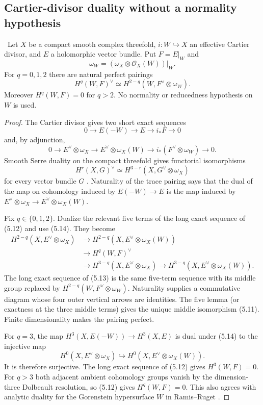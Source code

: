 \subsection{Cartier-divisor duality without a normality hypothesis}

\begin{theorem}
\label{thm:cartier-duality}
\Verified\ Let $X$ be a compact smooth complex threefold,
$i:W\hookrightarrow X$ an effective Cartier divisor, and $E$ a holomorphic
vector bundle.  Put $F=E|_W$ and
\[
\omega_W=(\omega_X\otimes\mathcal O_X(W))|_W.
\]
For $q=0,1,2$ there are natural perfect pairings
\[
H^q(W,F)^\vee
\simeq H^{2-q}(W,F^\vee\otimes\omega_W).
\tag{5.11}
\]
Moreover $H^q(W,F)=0$ for $q>2$.  No normality or reducedness hypothesis on
$W$ is used.
\end{theorem}

\begin{proof}
The Cartier divisor gives two short exact sequences
\[
0\to E(-W)\to E\to i_*F\to0
\tag{5.12}
\]
and, by adjunction,
\[
0\to E^\vee\otimes\omega_X
\to E^\vee\otimes\omega_X(W)
\to i_*(F^\vee\otimes\omega_W)\to0.
\tag{5.13}
\]
Smooth Serre duality on the compact threefold gives functorial isomorphisms
\[
H^r(X,G)^\vee\simeq H^{3-r}(X,G^\vee\otimes\omega_X)
\tag{5.14}
\]
for every vector bundle $G$
\cite[Theorem~9.37]{Lee2024}.  Naturality of the trace pairing says that the
dual of the map on cohomology induced by $E(-W)\to E$ is the map induced by
$E^\vee\otimes\omega_X\to E^\vee\otimes\omega_X(W)$.

Fix $q\in\{0,1,2\}$.  Dualize the relevant five terms of the long exact
sequence of (5.12) and use (5.14).  They become
\[
\begin{split}
H^{2-q}(X,E^\vee\otimes\omega_X)
&\longrightarrow H^{2-q}(X,E^\vee\otimes\omega_X(W))\\
&\longrightarrow H^q(W,F)^\vee\\
&\longrightarrow H^{3-q}(X,E^\vee\otimes\omega_X)
\longrightarrow H^{3-q}(X,E^\vee\otimes\omega_X(W)).
\end{split}
\tag{5.15}
\]
The long exact sequence of (5.13) is the same five-term sequence with its
middle group replaced by
$H^{2-q}(W,F^\vee\otimes\omega_W)$.  Naturality supplies a commutative
diagram whose four outer vertical arrows are identities.  The five lemma
(or exactness at the three middle terms) gives the unique middle isomorphism
(5.11).  Finite dimensionality makes the pairing perfect.

For $q=3$, the map
$H^3(X,E(-W))\to H^3(X,E)$ is dual under (5.14) to the injective map
\[
H^0(X,E^\vee\otimes\omega_X)
\hookrightarrow H^0(X,E^\vee\otimes\omega_X(W)).
\]
It is therefore surjective.  The long exact sequence of (5.12) gives
$H^3(W,F)=0$.  For $q>3$ both adjacent ambient cohomology groups vanish by
the dimension-three Dolbeault resolution, so (5.12) gives
$H^q(W,F)=0$.  This also agrees with analytic duality for the Gorenstein
hypersurface $W$ in Ramis--Ruget
\cite[Theorems~1--2 and Proposition~2]{RamisRuget1970}.
\end{proof}

